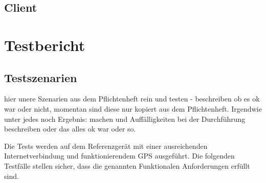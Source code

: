 \documentclass{scrartcl}
\begin{document}
\subsection{Client}
\newpage
\section{Testbericht}
\subsection{Testszenarien}
hier unere Szenarien aus dem Pflichtenheft rein und testen - beschreiben ob es ok war oder nicht, momentan sind diese nur kopiert aus dem Pflichtenheft.
Irgendwie unter jedes noch Ergebnis: machen und Auffälligkeiten bei der Durchführung beschreiben oder das alles ok war oder so.\newline

 
Die Tests werden auf dem Referenzgerät mit einer ausreichenden Internetverbindung und funktionierendem GPS ausgeführt. \newline
Die folgenden Testfälle stellen sicher, dass die genannten Funktionalen Anforderungen erfüllt sind.
\end{document}
